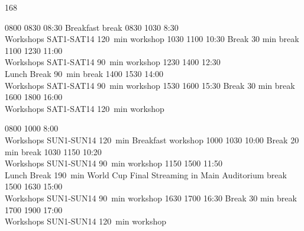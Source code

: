 \setslotsize{3cm}{1.3mm}
 {168}
\settextframe{1.5mm}
\setbottomspace{0pt}
\begin{timetable}

   {0800} {0830} {08:30 Breakfast}                      {}                            {}        {break}
   {0830} {1030} {8:30\\\vspace{0.2em}Workshops SAT1-SAT14}        {120~min}                {}                   {workshop}
   {1030} {1100} {10:30 Break}                              {\vspace{1.5mm}30 min}  {}     {break}
   {1100} {1230} {11:00\\\vspace{0.2em}Workshops SAT1-SAT14}        {90~min}                {}                   {workshop}
   {1230} {1400} {12:30\\\vspace{0.2em}Lunch Break}         {90~min}                {}                   {break}
   {1400} {1530} {14:00\\\vspace{0.2em}Workshops SAT1-SAT14}        {90~min}                {}                   {workshop}
   {1530} {1600} {15:30 Break}                              {\vspace{1.5mm}30 min}  {}     {break}
   {1600} {1800} {16:00\\\vspace{0.2em}Workshops SAT1-SAT14}        {120~min}                {}                   {workshop}
 
   {0800} {1000} {8:00\\\vspace{0.2em}Workshops SUN1-SUN14}        {120~min}                {Breakfast}                   {workshop}
   {1000} {1030} {10:00 Break}                              {\vspace{1.5mm}20 min}  {}     {break}
   {1030} {1150} {10:20\\\vspace{0.2em}Workshops SUN1-SUN14}        {90~min}                {}                   {workshop}
   {1150} {1500} {11:50\\\vspace{0.2em}Lunch Break}         {190~min}                {\vspace{-6.5mm}World Cup Final Streaming in Main Auditorium}                   {break}
   {1500} {1630} {15:00\\\vspace{0.2em}Workshops SUN1-SUN14}        {90~min}                {}                   {workshop}
   {1630} {1700} {16:30 Break}                              {\vspace{1.5mm}30 min}  {}     {break}
   {1700} {1900} {17:00\\\vspace{0.2em}Workshops SUN1-SUN14}        {120~min}                {}                   {workshop}



\end{timetable}
